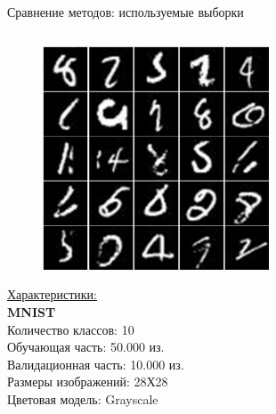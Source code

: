\documentclass[10pt]{beamer}
\begin{document}
        \begin{frame}{Сравнение методов: используемые выборки}
        \begin{columns}
            \begin{column}{0.5\textwidth}
                \begin{figure}[H]
                    \centering
                    \includegraphics[width=0.6\textwidth]{pic3-12.pdf}
                \end{figure}
                \underline{Характеристики:}\\
                \textbf{MNIST}\\
                Количество классов: 10\\
                Обучающая часть: 50.000 из.\\
                Валидационная часть: 10.000 из.\\
                Размеры изображений: 28Х28\\
                Цветовая модель: Grayscale
            \end{column}
            

\end{columns}
\end{frame}
\end{document}
